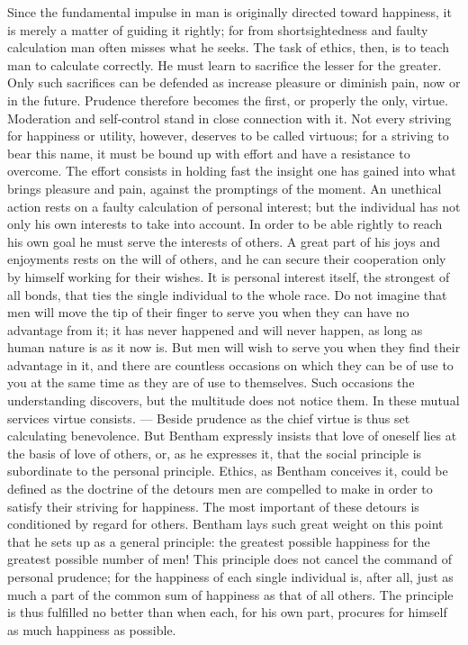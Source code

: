 \documentclass[12pt,a4paper,openany]{book}
\newcommand{\opage}[1]{\marginnote{\footnotesize\textit{[#1]}}}
\begin{document}
Since the fundamental impulse in man is originally directed toward happiness,
it is merely a matter of guiding it rightly; for from shortsightedness and
faulty calculation man often misses what he seeks. The task of ethics, then,
is to teach man to calculate correctly. He must learn to sacrifice the lesser
for the greater. Only such sacrifices can be defended as increase pleasure or
diminish pain, now or in the future. Prudence therefore becomes the first, or
properly the only, virtue. Moderation and self-control stand in close
connection with it. Not every striving for happiness or utility, however,
deserves to be called virtuous; for a striving to bear this name, it must be
bound up with effort and have a resistance to overcome. The effort consists in
holding fast the insight one has gained into what brings pleasure and pain,
against the promptings of the moment. An unethical action rests on a faulty
calculation of personal interest; but the individual has not only his own
interests to take into account. In order to be able rightly to reach his own
goal he must serve the interests of others. A great part of his joys and
enjoyments rests on the will of others, and he can secure their cooperation %
only by himself working for their wishes. It is personal interest itself, the
strongest of all bonds, that ties the single individual to the whole race. Do
not imagine that men will move the tip of their finger \opage{25}to serve you
when they can have no advantage from it; it has never happened and will never
happen, as long as human nature is as it now is. But men will wish to serve
you when they find their advantage in it, and there are countless occasions on
which they can be of use to you at the same time as they are of use to
themselves. Such occasions the understanding discovers, but the multitude does
not notice them. In these mutual services virtue consists. --- Beside prudence
as the chief virtue is thus set calculating benevolence. But Bentham expressly
insists that love of oneself lies at the basis of love of others, or, as he
expresses it, that the social principle is subordinate to the personal
principle. Ethics, as Bentham conceives it, could be defined as the doctrine
of the detours men are compelled to make in order to satisfy their striving
for happiness. The most important of these detours is conditioned by regard
for others. Bentham lays such great weight on this point that he sets up as a
general principle: the greatest possible happiness for the greatest possible
number of men! This principle does not cancel the command of personal
prudence; for the happiness of each single individual is, after all, just as
much a part of the common sum of happiness as that of all others. The
principle is thus fulfilled no better than when each, for his own part,
procures for himself as much happiness as possible.
\end{document}
